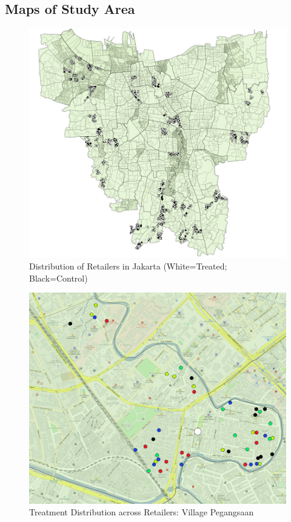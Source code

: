 \documentclass[11.5pt]{article}
\begin{document}
{\begin{appendices}
\appendix


\pagebreak
\begin{landscape}
\section{Maps of Study Area} \label{sec:maps}

\begin{figure}[h!]
    \centering
    \caption{Distribution of Retailers in Jakarta (White=Treated; Black=Control)}
    \includegraphics[width=120mm]{FigmapTC.png}
\end{figure}


\begin{figure}[h!]
    \centering
    \caption{Treatment Distribution across Retailers: Village Pegangsaan}
   \includegraphics[width=120mm]{FigmapZoom.png}
\end{figure}



\end{landscape}
\end{appendices}}
\end{document}

